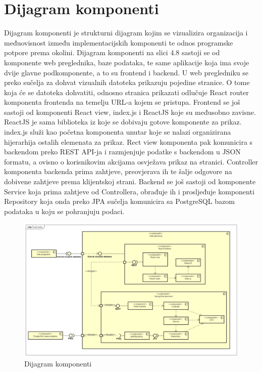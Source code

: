 			 
			
			\eject
		\section{Dijagram komponenti}
		
		
			 Dijagram komponenti je strukturni dijagram kojim se vizualizira organizacija i međuovisnost između implementacijskih komponenti te odnos programske potpore prema okolini. Dijagram komponenti na slici 4.8 sastoji se od komponente web preglednika, baze podataka, te same aplikacije koja ima svoje dvije glavne podkomponente, a to su frontend i backend. U web pregledniku se preko sučelja za dohvat vizualnih datoteka prikazuju pojedine stranice. O tome koja će se datoteka dohvatiti, odnosno stranica prikazati odlučuje React router komponenta frontenda na temelju URL-a kojem se pristupa. Frontend se još sastoji od komponenti React view, index.js i ReactJS koje su međusobno zavisne. ReactJS je sama biblioteka iz koje se dobivaju gotove komponente za prikaz. index.js služi kao početna komponenta unutar koje se nalazi organizirana hijerarhija ostalih elemenata za prikaz. Rect view komponenta pak komunicira s backendom preko REST API-ja i razmjenjuje podatke s backendom u JSON formatu, a ovisno o korisnikovim akcijama osvježava prikaz na stranici. Controller komponenta backenda prima zahtjeve, preovjerava ih te šalje odgovore na dobivene zahtjeve prema klijentskoj strani. Backend se još sastoji od komponente Service koja prima zahtjeve od Controllera, obrađuje ih i prosljeđuje komponenti Repository koja onda preko JPA sučelja komunicira sa PostgreSQL bazom podataka u koju se pohranjuju podaci.
			 
			 \begin{figure}[H]
			 	\centering
			 	\includegraphics[width=15cm]{slike/Dijagram komponenti}
			 	\caption{Dijagram komponenti}
			 	\label{fig:Component-Diagram}
			 \end{figure}